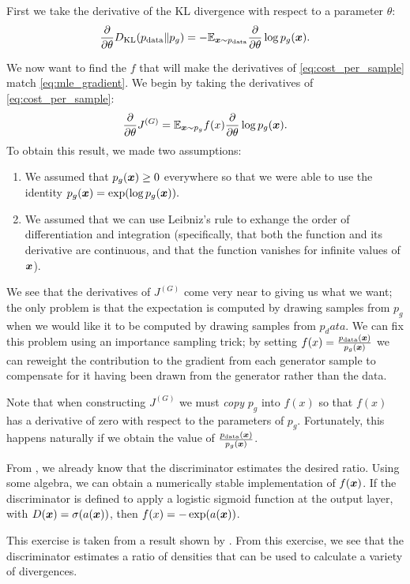 First we take the derivative of the KL divergence with respect to a parameter $\theta$:
\begin{equation}
  \frac{\partial}{\partial \theta} D_{\mathrm{KL}}(p_{\rm{data}} \Vert p_g) = - \mathbb{E}_{{\bm{x}} \sim p_{\rm{data}}} \frac{\partial}{\partial \theta} \log p_g({\bm{x}}) .
\label{eq:mle_gradient}
\end{equation}

We now want to find the $f$ that will make the derivatives of \eqref{eq:cost_per_sample} match \eqref{eq:mle_gradient}.
We begin by taking the derivatives of \eqref{eq:cost_per_sample}:
\[
  \frac{\partial}{\partial \theta} J^{(G)} = \mathbb{E}_{{\bm{x}} \sim p_g} f(x) \frac{\partial}{\partial \theta} \log p_g({\bm{x}}).
\]
To obtain this result, we made two assumptions:
\begin{enumerate}
  \item We assumed that $p_g({\bm{x}}) \geq 0$ everywhere so that we were able to use the identity $p_g({\bm{x}}) = \exp( \log p_g({\bm{x}}) ).$
  \item We assumed that we can use Leibniz's rule to exhange the order of differentiation and integration (specifically, that both the function and its derivative are continuous, and that the function vanishes for infinite values of ${\bm{x}}$).
\end{enumerate}

We see that the derivatives of $J^{(G)}$ come very near to giving us what we want; the only problem is that
the expectation is computed by drawing samples from $p_g$ when we would like it to be computed by drawing
samples from $p_data$.
We can fix this problem using an importance sampling trick; by setting $f(x) = \frac{p_{\rm{data}}({\bm{x}})}{p_g({\bm{x}})}$
we can reweight the contribution to the gradient from each generator sample to compensate for it having
been drawn from the generator rather than the data.

Note that when constructing $J^{(G)}$ we must {\em copy} $p_g$ into $f(x)$ so that $f(x)$ has a derivative of
zero with respect to the parameters of $p_g$.
Fortunately, this happens naturally if we obtain the value of $\frac{p_{\rm{data}}({\bm{x}})}{p_g({\bm{x}})}$.

From , we already know that the discriminator estimates the desired ratio.
Using some algebra, we can obtain a numerically stable implementation of $f({\bm{x}})$.
If the discriminator is defined to apply a logistic sigmoid function at the output layer,
with $D({\bm{x}}) = \sigma( a({\bm{x}}) )$, then $f(x) = - \exp(a({\bm{x}}))$.

This exercise is taken from a result shown by \citet{Goodfellow-ICLR2015}.
From this exercise, we see that the discriminator estimates a ratio of densities
that can be used to calculate a variety of divergences.
